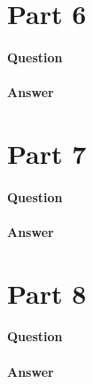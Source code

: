 \documentclass[11pt,twoside]{article}
\begin{document}
\section*{Part 6}
\paragraph{Question}

\paragraph{Answer}


\clearpage

\section*{Part 7}
\paragraph{Question}


\paragraph{Answer}


\clearpage

\section*{Part 8}
\paragraph{Question}


\paragraph{Answer}


\clearpage
\end{document}
